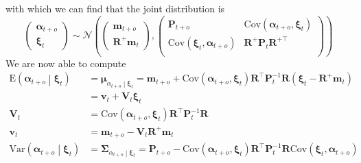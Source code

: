 \documentclass[notitlepage]{article}
\renewcommand{\vec}[1]{\bm{#1}}
\newcommand{\mat}[1]{\mathbf{#1}}
\newcommand{\Lparen}[1]{\left( #1\right)}
\newcommand{\Cond}[2]{ #1 \middle\vert  #2}
\newcommand{\VAR}{\text{Var}}
\newcommand{\E}{\text{E}}
\newcommand{\COV}{\text{Cov}}
\newcommand{\optor}[2]{#1\Lparen{#2}}
\newcommand{\optorC}[3]{\optor{#1}{\Cond{#2}{#3}}}
\newcommand{\expecC}[2]{\optorC{\E}{#1}{#2}}
\newcommand{\varpC}[2]{\optorC{\VAR}{#1}{#2}}
\newcommand{\covp}[1]{\optor{\COV}{#1}}
\newcommand\subCond[3]{#1_{\left. #2 \middle\vert #3\right.}}
\newcommand{\normal}[2]{\optor{\mathcal{N}}{#1,#2}}
\begin{document}
% 
with which we can find that the joint distribution is %
%
$$
\begin{pmatrix}
	\vec \alpha_{t + o} \\ \vec \xi_t
\end{pmatrix} \sim  \normal{%
	\begin{pmatrix} \vec m_{t+o} \\ \mat R^+\vec m_t  \end{pmatrix}}{%
	\begin{pmatrix}
		\mat P_{t + o} & \covp{\vec\alpha_{t + o}, \vec\xi_t} \\
		\covp{\vec\xi_t, \vec\alpha_{t + o}} &  \mat R^+\mat P_t \mat R^{+\top} \\
	\end{pmatrix}
}
$$%
% 
We are now able to compute %
%
\begin{align*}
\expecC{\vec \alpha_{t + o}}{\vec \xi_t} &= 
	\subCond{\vec\mu}{\alpha_{t + o}}{\vec\xi_t}
	= \vec m_{t + o} + \covp{\vec\alpha_{t + o}, \vec\xi_t}
		\mat R^\top\mat P_t^{-1} \mat R\Lparen{\vec\xi_t - \mat R^+\vec m_t} \\
	&= \vec v_t + \mat V_t\vec\xi_t \\
\mat V_t &= \covp{\vec\alpha_{t + o}, \vec\xi_t}\mat R^\top\mat P_t^{-1} \mat R \\
\vec v_t &= \vec m_{t + o} - \mat V_t\mat R^+\vec m_t \\
\varpC{\vec \alpha_{t + o}}{\vec \xi_t} &=
	\subCond{\mat\Sigma}{\alpha_{t + o}}{\vec\xi_t} 
	= \mat P_{t + o} - \covp{\vec\alpha_{t + o}, \vec\xi_t}
		\mat R^\top\mat P_t^{-1} \mat R\covp{\vec\xi_t, \vec\alpha_{t + o}}
\end{align*}
\end{document}
